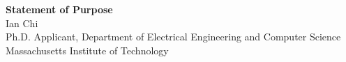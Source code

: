 \documentclass[11pt]{article}
\begin{document}
\begin{center}
    {\Large \textbf{Statement of Purpose}}\\[4pt]
    {\large Ian Chi}\\[2pt]
    Ph.D. Applicant, Department of Electrical Engineering and Computer Science\\
    Massachusetts Institute of Technology
\end{center}

\vspace{1em}

\end{document}
